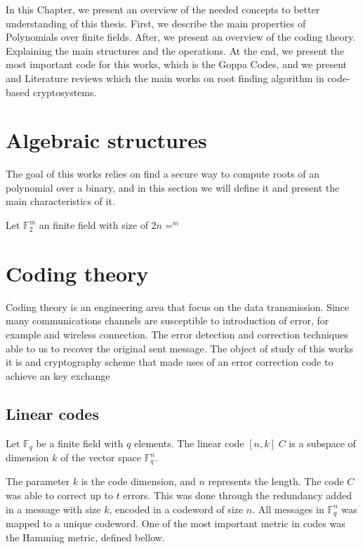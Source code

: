 In this Chapter, we present an overview of the needed concepts to better understanding of this thesis. First, we describe the main properties of Polynomials over finite fields. After, we present an overview of the coding theory. Explaining the main structures and the operations. At the end, we present the most important code for this works, which is the Goppa Codes, and we present and Literature reviews which the main works on root finding algorithm in code-based cryptosystems. 

\section{Algebraic structures}
The goal of this works relies on find a secure way to compute roots of an polynomial over a binary, and in this section we will define it and present the main characteristics of it.

\begin{definition}
Let $\mathbb{F}_{2}^{m}$ an finite field with size of $2n=^m$
\end{definition}{}

\section{Coding theory}
Coding theory is an engineering area that focus on the data transmission. Since many communications channels are susceptible to introduction of error, for example and wireless connection. The error detection and correction techniques able to us to recover the original sent message. The object of study of this works it is and cryptography scheme that made uses of an error correction code to achieve an key exchange

\subsection{Linear codes}
\begin{definition}
Let $\mathbb{F}_{q}$ be a finite field with $q$ elements. The linear code $[n, k]\;C$ is a subspace of dimension $k$ of the vector space $\mathbb{F}_{q}^n$.
\end{definition}

The parameter $k$ is the code dimension, and $n$ represents the length. The code $C$ was able to correct up to $t$ errors. This was done through the redundancy added in a message with size $k$, encoded in a codeword of size $n$. All messages in $\mathbb{F}_{q}^n$ was mapped to a unique codeword. One of the most important metric in codes was the Hamming metric, defined bellow.

